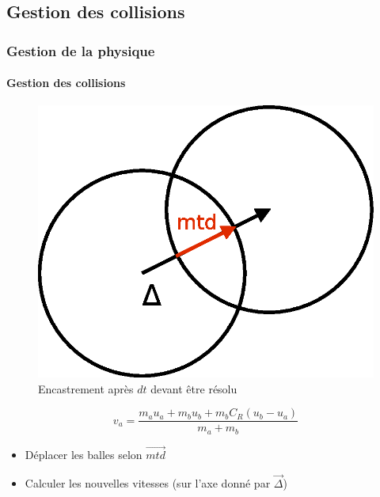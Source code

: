\documentclass[xcolor=x11names,compress,11pt]{beamer}
\renewcommand{\(}{\begin{columns}}
\renewcommand{\)}{\end{columns}}
\newcommand{\<}[1]{\begin{column}{#1}}
\renewcommand{\>}{\end{column}}
\begin{document}
\subsection*{Gestion des collisions}
\begin{frame}
  \frametitle{Gestion de la physique}
  \framesubtitle{Gestion des collisions}

  \begin{figure}[h]
    \centering
    \includegraphics[scale=0.25]{collision.eps}
    \caption{Encastrement après $dt$ devant être résolu}
    
  \end{figure}

  \[
  v_a = \frac{m_a u_a + m_b u_b + m_b C_R (u_b - u_a)}{m_a + m_b}
  \]

  \begin{itemize}
  \item Déplacer les balles selon $\overrightarrow{mtd}$
  \item Calculer les nouvelles vitesses (sur l'axe donné par $\overrightarrow{\Delta}$)
  \end{itemize}

\end{frame}


\end{document}
